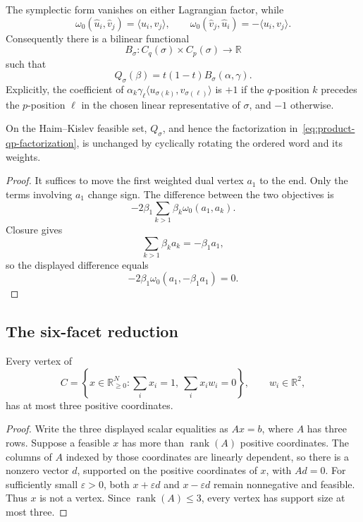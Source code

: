 The symplectic form vanishes on either Lagrangian factor, while
\[
  \omega_0(\widehat u_i,\widehat v_j)=\langle u_i,v_j\rangle,
  \qquad
  \omega_0(\widehat v_j,\widehat u_i)=-\langle u_i,v_j\rangle.
\]
Consequently there is a bilinear functional
\[
  B_\sigma:C_q(\sigma)\times C_p(\sigma)\longrightarrow\mathbb R
\]
such that
\begin{equation}
  Q_\sigma(\beta)
  =
  t(1-t)B_\sigma(\alpha,\gamma).
  \label{eq:product-qp-factorization}
\end{equation}
Explicitly, the coefficient of
\(\alpha_k\gamma_\ell\langle u_{\sigma(k)},v_{\sigma(\ell)}\rangle\)
is \(+1\) if the \(q\)-position \(k\) precedes the \(p\)-position \(\ell\)
in the chosen linear representative of \(\sigma\), and \(-1\) otherwise.

\begin{lemma}
\label{lem:product-qp-cyclic-cut-invariance}
On the Haim--Kislev feasible set, \(Q_\sigma\), and hence the factorization
in~\eqref{eq:product-qp-factorization}, is unchanged by cyclically rotating
the ordered word and its weights.
\end{lemma}

\begin{proof}
It suffices to move the first weighted dual vertex \(a_1\) to the end.
Only the terms involving \(a_1\) change sign.  The difference between the two
objectives is
\[
  -2\beta_1\sum_{k>1}\beta_k\omega_0(a_1,a_k).
\]
Closure gives
\[
  \sum_{k>1}\beta_k a_k=-\beta_1a_1,
\]
so the displayed difference equals
\[
  -2\beta_1\omega_0(a_1,-\beta_1a_1)=0.
\]
\end{proof}

\subsection{The six-facet reduction}
\label{subsec:product-qp-six-facet-theorem}

\begin{lemma}
\label{lem:planar-closure-vertex-support}
Every vertex of
\[
  C=\left\{
    x\in\mathbb R_{\geq0}^N:
    \sum_i x_i=1,\
    \sum_i x_iw_i=0
  \right\},
  \qquad w_i\in\mathbb R^2,
\]
has at most three positive coordinates.
\end{lemma}

\begin{proof}
Write the three displayed scalar equalities as \(Ax=b\), where \(A\) has
three rows.  Suppose a feasible \(x\) has more than
\(\operatorname{rank}(A)\) positive coordinates.  The columns of \(A\)
indexed by those coordinates are linearly dependent, so there is a nonzero
vector \(d\), supported on the positive coordinates of \(x\), with \(Ad=0\).
For sufficiently small \(\varepsilon>0\), both
\(x+\varepsilon d\) and \(x-\varepsilon d\) remain nonnegative and feasible.
Thus \(x\) is not a vertex.  Since \(\operatorname{rank}(A)\leq3\), every
vertex has support size at most three.
\end{proof}

